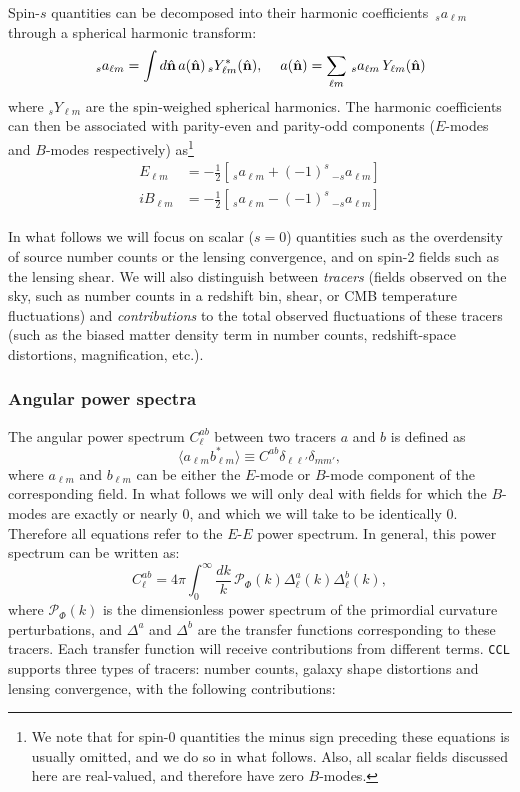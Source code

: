 \documentclass[\docopts]{\docclass}
\newcommand{\nv}{\hat{\bf n}}
\newcommand{\ccl}{{\tt CCL}\xspace}
\begin{document}
Spin-$s$ quantities can be decomposed into their harmonic coefficients $\,_sa_{\ell m}$ through a spherical harmonic transform:
\begin{equation}\nonumber
  \,_sa_{\ell m}=\int d\nv\,a(\nv)\,_sY^*_{\ell m}(\nv),\hspace{12pt}
  a(\nv)=\sum_{\ell m}\,_sa_{\ell m}\,Y_{\ell m}(\nv)
\end{equation}
where $_sY_{\ell m}$ are the spin-weighed spherical harmonics. The harmonic coefficients can then be associated with parity-even and parity-odd components ($E$-modes and $B$-modes respectively) as\footnote{We note that for spin-$0$ quantities the minus sign preceding these equations is usually omitted, and we do so in what follows. Also, all scalar fields discussed here are real-valued, and therefore have zero $B$-modes.}
\begin{align}\nonumber
   E_{\ell m}&=-\frac{1}{2}\left[\,_{s}a_{\ell m}+(-1)^s\,_{-s}a_{\ell m}\right]\\
  iB_{\ell m}&=-\frac{1}{2}\left[\,_{s}a_{\ell m}-(-1)^s\,_{-s}a_{\ell m}\right]
\end{align}

In what follows we will focus on scalar ($s=0$) quantities such as the overdensity of source number counts or the lensing convergence, and on spin-2 fields such as the lensing shear. We will also distinguish between {\sl tracers} (fields observed on the sky, such as number counts in a redshift bin, shear, or CMB temperature fluctuations) and {\sl contributions} to the total observed fluctuations of these tracers (such as the biased matter density term in number counts, redshift-space distortions, magnification, etc.).

\subsubsection{Angular power spectra}\label{sssec:2pt.pspec}

The angular power spectrum $C^{ab}_\ell$ between two tracers $a$ and $b$ is defined as
\begin{equation}
  \langle a_{\ell m}b^*_{\ell m}\rangle\equiv C^{ab}\delta_{\ell\ell'}\delta_{mm'},
\end{equation}
where $a_{\ell m}$ and $b_{\ell m}$ can be either the $E$-mode or $B$-mode component of the corresponding field. In what follows we will only deal with fields for which the $B$-modes are exactly or nearly $0$, and which we will take to be identically $0$. Therefore all equations refer to the $E$-$E$ power spectrum. In general, this power spectrum can be written as:
\begin{equation}
  C^{ab}_\ell=4\pi\int_0^\infty \frac{dk}{k}\,\mathcal{P}_\Phi(k)\Delta^a_\ell(k)\Delta^b_\ell(k),
  \label{eq:cls}
\end{equation}
where $\mathcal{P}_\Phi(k)$ is the dimensionless power spectrum of the primordial curvature perturbations, and $\Delta^a$ and $\Delta^b$ are the transfer functions corresponding to these tracers. Each transfer function will receive contributions from different terms. \ccl supports three types of tracers: number counts, galaxy shape distortions and lensing convergence, with the following contributions:
\end{document}
